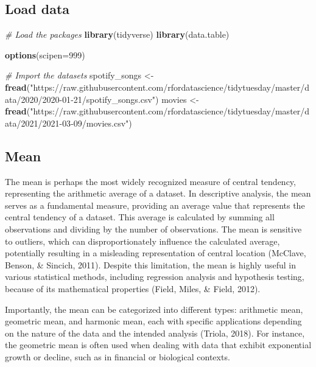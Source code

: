 \documentclass[
]{book}
\newenvironment{Shaded}{\begin{snugshade}}{\end{snugshade}}
\newcommand{\AttributeTok}[1]{\textcolor[rgb]{0.13,0.29,0.53}{#1}}
\newcommand{\CommentTok}[1]{\textcolor[rgb]{0.56,0.35,0.01}{\textit{#1}}}
\newcommand{\DecValTok}[1]{\textcolor[rgb]{0.00,0.00,0.81}{#1}}
\newcommand{\FunctionTok}[1]{\textcolor[rgb]{0.13,0.29,0.53}{\textbf{#1}}}
\newcommand{\NormalTok}[1]{#1}
\newcommand{\OtherTok}[1]{\textcolor[rgb]{0.56,0.35,0.01}{#1}}
\newcommand{\StringTok}[1]{\textcolor[rgb]{0.31,0.60,0.02}{#1}}
\begin{document}
\subsection*{Load data}\label{load-data}

\begin{Shaded}
\begin{Highlighting}[]
\CommentTok{\# Load the packages}
\FunctionTok{library}\NormalTok{(tidyverse)}
\FunctionTok{library}\NormalTok{(data.table)}

\FunctionTok{options}\NormalTok{(}\AttributeTok{scipen=}\DecValTok{999}\NormalTok{)}

\CommentTok{\# Import the datasets}
\NormalTok{spotify\_songs }\OtherTok{\textless{}{-}} \FunctionTok{fread}\NormalTok{(}\StringTok{"https://raw.githubusercontent.com/rfordatascience/tidytuesday/master/data/2020/2020{-}01{-}21/spotify\_songs.csv"}\NormalTok{)}
\NormalTok{movies }\OtherTok{\textless{}{-}} \FunctionTok{fread}\NormalTok{(}\StringTok{"https://raw.githubusercontent.com/rfordatascience/tidytuesday/master/data/2021/2021{-}03{-}09/movies.csv"}\NormalTok{)}
\end{Highlighting}
\end{Shaded}

\subsection*{Mean}\label{mean}

The mean is perhaps the most widely recognized measure of central tendency, representing the arithmetic average of a dataset. In descriptive analysis, the mean serves as a fundamental measure, providing an average value that represents the central tendency of a dataset. This average is calculated by summing all observations and dividing by the number of observations. The mean is sensitive to outliers, which can disproportionately influence the calculated average, potentially resulting in a misleading representation of central location (McClave, Benson, \& Sincich, 2011). Despite this limitation, the mean is highly useful in various statistical methods, including regression analysis and hypothesis testing, because of its mathematical properties (Field, Miles, \& Field, 2012).

Importantly, the mean can be categorized into different types: arithmetic mean, geometric mean, and harmonic mean, each with specific applications depending on the nature of the data and the intended analysis (Triola, 2018). For instance, the geometric mean is often used when dealing with data that exhibit exponential growth or decline, such as in financial or biological contexts.
\end{document}
